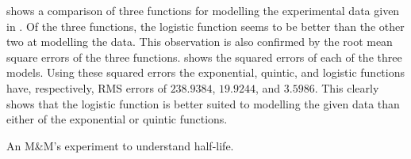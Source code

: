 \documentclass[a4paper,oneside,12pt]{article}
\begin{document}
\begin{problem}
{\begin{solution}
 shows a comparison of three
functions for modelling the experimental data given in
.  Of the three functions, the logistic function
seems to be better than the other two at modelling the data.  This
observation is also confirmed by the root mean square errors of the
three functions.   shows the squared
errors of each of the three models.  Using these squared errors the
exponential, quintic, and logistic functions have, respectively, RMS
errors of $238.9384$, $19.9244$, and $3.5986$.  This clearly shows
that the logistic function is better suited to modelling the given
data than either of the exponential or quintic functions.
\end{solution}
}{}

\item An M\&M's experiment to understand half-life.
\end{problem}
\end{document}
